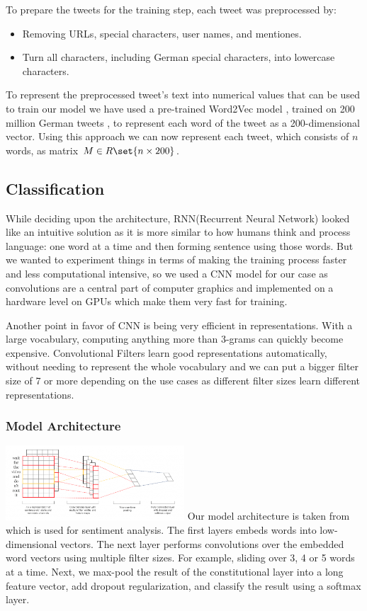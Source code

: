 \documentclass[10pt, oneside]{article}
\begin{document}
\begin{multicols}{2}
To prepare the tweets for the training step, each tweet was preprocessed by:
\begin{itemize}
\item Removing URLs, special characters, user names, and mentiones.
\item Turn all characters, including German special characters, into lowercase characters.
\end{itemize}

To represent the preprocessed tweet’s text into numerical values that can be used to train our model we have used  a pre-trained Word2Vec model \cite{DBLP:journals/corr/abs-1301-3781}, trained on 200 million German tweets \cite{cieliebak2017twitter},  to represent each word of the tweet as a  200-dimensional vector.  Using this approach we can now represent each tweet, which consists of $n$ words, as matrix $M \in R \set{n \times 200}$.

\subsection{Classification}

While deciding upon the architecture, RNN(Recurrent Neural Network) looked like an intuitive solution as it is more similar to how humans think and process language: one word at a time and then forming sentence using those words. But we wanted to experiment things in terms of making the training process faster and less computational intensive, so we used a CNN model for our case as convolutions are a central part of computer graphics and implemented on a hardware level on GPUs which make them very fast for training.

Another point in favor of CNN is being very efficient in representations.  With a large vocabulary, computing anything more than 3-grams can quickly become expensive.  Convolutional Filters learn good representations automatically, without needing to represent the whole vocabulary and we can put a bigger filter size of 7 or more depending on the use cases as different filter sizes learn different representations. 

\subsubsection{Model Architecture}
\includegraphics[width=0.5\textwidth]{images/cnn_architecture1.png}
Our model architecture is taken from \cite{Kim2014} which is used for sentiment analysis. The first layers embeds words into low-dimensional vectors. The next layer performs convolutions over the embedded word vectors using multiple filter sizes. For example, sliding over 3, 4 or 5 words at a time. Next, we max-pool the result of the constitutional layer into a long feature vector, add dropout regularization, and classify the result using a softmax layer.




\end{multicols}
\end{document}
